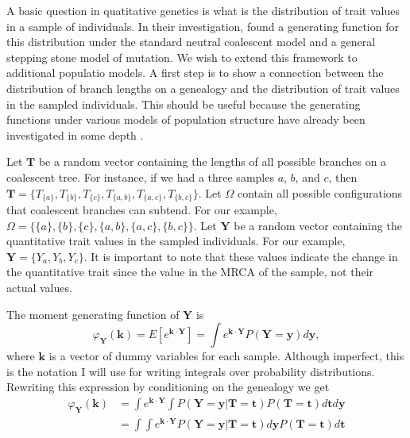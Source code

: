 A basic question in quatitative genetics is what is the distribution of trait
values in a sample of individuals. In their investigation, \citet{Schraiber2015}
found a generating function for this distribution under the standard neutral
coalescent model and a general stepping stone model of mutation. We wish to
extend this framework to additional populatio models. A first step is to show a
connection between the distribution of branch lengths on a genealogy and the
distribution of trait values in the sampled individuals. This should be useful
because the generating functions under various models of population structure
have already been investigated in some depth \citep{Lohse2011}.

Let $\mathbf{T}$ be a random vector containing the lengths of all possible
branches on a coalescent tree. For instance, if we had a three samples $a$, $b$,
and $c$, then
$\mathbf{T}=\{T_{\{a\}},T_{\{b\}},T_{\{c\}},T_{\{a,b\}},T_{\{a,c\}},T_{\{b,c\}}\}$.
Let $\Omega$ contain all possible configurations that coalescent branches can
subtend. For our example,
$\Omega=\{\{a\},\{b\},\{c\},\{a,b\},\{a,c\},\{b,c\}\}$. Let $\mathbf{Y}$ be a
random vector containing the quantitative trait values in the sampled
individuals. For our example, $\mathbf{Y}=\{Y_a,Y_b,Y_c\}$. It is important to
note that these values indicate the change in the quantitative trait since the
value in the MRCA of the sample, not their actual values.

The moment generating function of $\mathbf{Y}$ is
\begin{equation}
  \varphi_{\mathbf{Y}}(\mathbf{k}) = E\left[ e^{\mathbf{k} \cdot \mathbf{Y}} \right] =
  \int e^{\mathbf{k} \cdot \mathbf{Y}} P(\mathbf{Y}=\mathbf{y}) d\mathbf{y},
\end{equation}
where $\mathbf{k}$ is a vector of dummy variables for each
sample. Although imperfect, this is the notation I will use for
writing integrals over probability distributions. Rewriting this
expression by conditioning on the genealogy we get
\begin{align}
  \varphi_{\mathbf{Y}}(\mathbf{k}) &= \int e^{\mathbf{k} \cdot \mathbf{Y}}
  \int P(\mathbf{Y}=\mathbf{y} | \mathbf{T}=\mathbf{t}) P(\mathbf{T}=\mathbf{t})
  d\mathbf{t} d\mathbf{y}\\
  &= \int \int e^{\mathbf{k} \cdot \mathbf{Y}} P(\mathbf{Y}=\mathbf{y} | \mathbf{T}=\mathbf{t}) d\mathbf{y}
  P(\mathbf{T}=\mathbf{t})
  d\mathbf{t}
\end{align}

